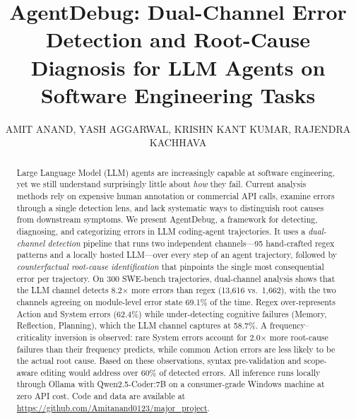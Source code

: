 \documentclass{ieeeaccess}
\begin{document}

\title{AgentDebug: Dual-Channel Error Detection and Root-Cause Diagnosis for LLM Agents on Software Engineering Tasks}

\author{
\uppercase{Amit Anand},
\uppercase{Yash Aggarwal},
\uppercase{Krishn Kant Kumar},
\uppercase{Rajendra Kachhava}
}

\address[1]{Department of Computer Science and Engineering, Indian Institute of Information Technology, Kota, Rajasthan, India (e-mail: 2023kucp1060@iiitkota.ac.in)}
\address[2]{Department of Computer Science and Engineering, Indian Institute of Information Technology, Kota, Rajasthan, India (e-mail: 2023kucp1057@iiitkota.ac.in)}
\address[3]{Department of Computer Science and Engineering, Indian Institute of Information Technology, Kota, Rajasthan, India (e-mail: 2023kucp1070@iiitkota.ac.in)}
\address[4]{Faculty, Department of Computer Science and Engineering, Indian Institute of Information Technology, Kota, Rajasthan, India (e-mail: rajendrakachhava@gmail.com)}


\begin{abstract}
Large Language Model (LLM) agents are increasingly capable at software engineering, yet we still understand surprisingly little about \emph{how} they fail. Current analysis methods rely on expensive human annotation or commercial API calls, examine errors through a single detection lens, and lack systematic ways to distinguish root causes from downstream symptoms. We present AgentDebug, a framework for detecting, diagnosing, and categorizing errors in LLM coding-agent trajectories. It uses a \emph{dual-channel detection} pipeline that runs two independent channels---95 hand-crafted regex patterns and a locally hosted LLM---over every step of an agent trajectory, followed by \emph{counterfactual root-cause identification} that pinpoints the single most consequential error per trajectory. On 300 SWE-bench trajectories, dual-channel analysis shows that the LLM channel detects 8.2$\times$ more errors than regex (13,616 vs.\ 1,662), with the two channels agreeing on module-level error state 69.1\% of the time. Regex over-represents Action and System errors (62.4\%) while under-detecting cognitive failures (Memory, Reflection, Planning), which the LLM channel captures at 58.7\%. A frequency--criticality inversion is observed: rare System errors account for 2.0$\times$ more root-cause failures than their frequency predicts, while common Action errors are less likely to be the actual root cause. Based on these observations, syntax pre-validation and scope-aware editing would address over 60\% of detected errors. All inference runs locally through Ollama with Qwen2.5-Coder:7B on a consumer-grade Windows machine at zero API cost. Code and data are available at \url{https://github.com/Amitanand0123/major_project}.
\end{abstract}
\end{document}
